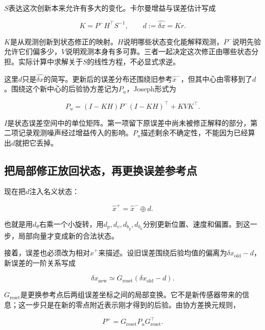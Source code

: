 $S$表达这次创新本来允许有多大的变化。卡尔曼增益与误差估计写成

\begin{equation}\label{eq-intuition-gain}
\boxed{K=P^-H^\top S^{-1},\qquad
 d:=\widehat{\delta x}=Kr.}
\end{equation}

$K$是从观测创新到状态修正的映射。$H$说明哪些状态变化能解释观测，$P^-$说明先验允许它们偏多少，$V$说明观测本身有多可靠。三者一起决定这次修正由哪些状态分担。实际计算中求解关于$S$的线性方程，不必显式求逆。

这里$d$只是$\widehat{\delta x}$的简写。更新后的误差分布还围绕旧参考$\hat x^-$，但其中心由零移到了$d$。围绕这个新中心的后验协方差记为$P_u$，Joseph形式为

\begin{equation}\label{eq-intuition-joseph}
P_u=(I-KH)P^-(I-KH)^\top+KVK^\top.
\end{equation}

$I$是状态误差空间中的单位矩阵。第一项留下原误差中尚未被修正解释的部分，第二项记录观测噪声经过增益传入的影响。$P_u$描述剩余不确定性，不能因为已经算出$d$就把它丢掉。

\subsection{把局部修正放回状态，再更换误差参考点}

现在把$d$注入名义状态：

\begin{equation}\label{eq-intuition-injection}
\boxed{\hat x^+=\hat x^-\oplus d.}
\end{equation}

也就是用$d_\theta$右乘一个小旋转，用$d_p,d_v,d_{b_g},d_{b_a}$分别更新位置、速度和偏置。到这一步，局部向量才变成新的合法状态。

接着，误差也必须改为相对$\hat x^+$来描述。设旧误差围绕后验均值的偏离为$\delta x_{\mathrm{old}}-d$，新误差的一阶关系写成

\begin{equation*}
\delta x_{\mathrm{new}}
 \simeq G_{\mathrm{reset}}(\delta x_{\mathrm{old}}-d).
\end{equation*}

$G_{\mathrm{reset}}$是更换参考点后两组误差坐标之间的局部变换。它不是新传感器带来的信息；这一步只是在新的零点附近表示刚才得到的后验。由协方差换元规则，

\begin{equation}\label{eq-intuition-reset}
\boxed{P^+=G_{\mathrm{reset}}P_uG_{\mathrm{reset}}^\top.}
\end{equation}

